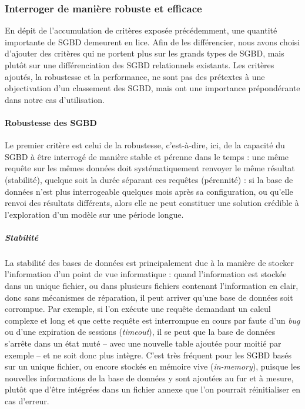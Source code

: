 		\subsubsection{Interroger de manière robuste et efficace}\label{subsubsec:interroger-robuste-efficace}

		En dépit de l'accumulation de critères exposée précédemment, une quantité importante de SGBD demeurent en lice.
		Afin de les différencier, nous avons choisi d'ajouter des critères qui ne portent plus sur les grands types de SGBD, mais plutôt sur une différenciation des SGBD relationnels existants.
		Les critères ajoutés, la robustesse et la performance, ne sont pas des \og prétextes \fg{} à une objectivation d'un classement des SGBD, mais ont une importance prépondérante dans notre cas d'utilisation.

		\paragraph*{Robustesse des SGBD}
		Le premier critère est celui de la robustesse, c'est-à-dire, ici, de la capacité du SGBD à être interrogé de manière stable et pérenne dans le temps : une même requête sur les mêmes données doit systématiquement renvoyer le même résultat (stabilité), quelque soit la durée séparant ces requêtes (pérennité) : si la base de données n'est plus interrogeable quelques mois après sa configuration, ou qu'elle renvoi des résultats différents, alors elle ne peut constituer une solution crédible à l'exploration d'un modèle sur une période longue.

		\subparagraph{Stabilité}
		La stabilité des bases de données est principalement due à la manière de stocker l'information d'un point de vue informatique : quand l'information est stockée dans un unique fichier, ou dans plusieurs fichiers contenant l'information \og en clair\fg{}, donc sans mécanismes de réparation, il peut arriver qu'une base de données soit \og corrompue\fg{}.
		Par exemple, si l'on exécute une requête demandant un calcul complexe et long et que cette requête est interrompue en cours par faute d'un \textit{bug} ou d'une expiration de sessions (\textit{timeout}), il se peut que la base de données s'arrête dans un état muté -- avec une nouvelle table ajoutée pour moitié par exemple -- et ne soit donc plus intègre.
		C'est très fréquent pour les SGBD basés sur un unique fichier, ou encore stockés en mémoire vive (\og \textit{in-memory}\fg{}), puisque les nouvelles informations de la base de données y sont ajoutées au fur et à mesure, plutôt que d'être intégrées dans un fichier annexe que l'on pourrait réinitialiser en cas d'erreur.

